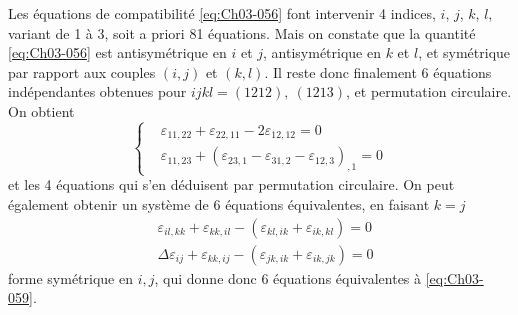 Les équations de compatibilité \eqref{eq:Ch03-056} font intervenir 4 indices, $i$, $j$, $k$, $l$, variant de 1 à 3, soit a priori 81 équations.
Mais on constate que la quantité \eqref{eq:Ch03-056} est antisymétrique en $i$ et $j$, antisymétrique en $k$ et $l$, et symétrique par rapport aux couples $(i,j)$ et $(k,l)$.
Il reste donc finalement 6 équations indépendantes obtenues pour $ijkl = (1212),\ (1213)$, et permutation circulaire.
On obtient
\begin{equation}
    \left\{
    \begin{aligned}
        &\varepsilon_{11,22} + \varepsilon_{22,11} - 2 \varepsilon_{12,12} = 0 \\
        &\varepsilon_{11,23} + \left( \varepsilon_{23,1} - \varepsilon_{31,2} - \varepsilon_{12,3} \right)_{,1} = 0
    \end{aligned}
    \right.
    \label{eq:Ch03-059}
\end{equation}
et les 4 équations qui s'en déduisent par permutation circulaire.
On peut également obtenir un système de 6 équations équivalentes, en faisant $k=j$
\begin{equation}
    \begin{aligned}
        &\varepsilon_{il,kk} + \varepsilon_{kk,il} - \left( \varepsilon_{kl,ik} + \varepsilon_{ik,kl} \right) = 0 \\
        &\Delta\varepsilon_{ij} + \varepsilon_{kk,ij} - \left( \varepsilon_{jk,ik} + \varepsilon_{ik,jk} \right) = 0
    \end{aligned}
    \label{eq:Ch03-060}
\end{equation}
forme symétrique en $i,j$, qui donne donc 6 équations équivalentes à \eqref{eq:Ch03-059}.

